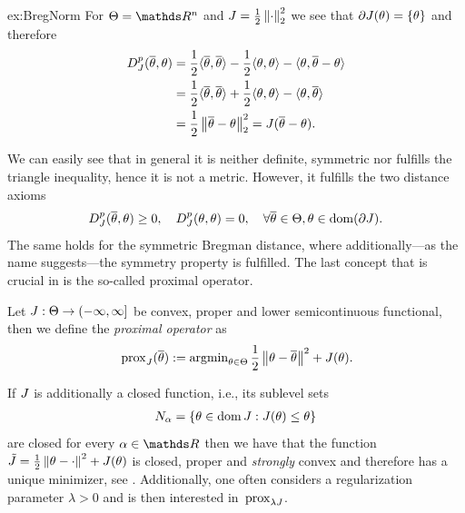 %
\begin{example}{}{ex:BregNorm}
	For $\Param=\R^n$ and $J=\frac{1}{2}\left\|\cdot\right\|_2^2$ we see that $\partial J(\theta) = \{\theta\}$ and therefore
	\begin{align*}
		D_J^p(\overline{\theta}, \theta) &= 
		\frac{1}{2}\langle \overline{\theta},\overline{\theta}\rangle - 
		\frac{1}{2}\langle \theta,\theta\rangle - \langle \theta, \overline{\theta}-\theta\rangle 
		\\&=
		\frac{1}{2}\langle \overline{\theta},\overline{\theta}\rangle+
		\frac{1}{2}\langle \theta,\theta\rangle -
		\langle \theta,\overline{\theta}\rangle
		\\&=
		\frac{1}{2}\left\|\overline{\theta} - \theta\right\|_2^2 = J(\overline{\theta} - \theta).
	\end{align*}
\end{example}
%
We can easily see that in general it is neither definite, symmetric nor fulfills the triangle inequality, hence it is not a metric. 
However, it fulfills the two distance axioms
\begin{align}
	D^p_J(\overline{\theta},\theta) \geq 0,\quad D^p_J(\theta,\theta)=0,\quad\forall\overline{\theta}\in\Theta,\theta\in\operatorname{dom}(\partial J).
\end{align}
%
The same holds for the symmetric Bregman distance, where additionally---as the name suggests---the symmetry property is fulfilled.
%
%
The last concept that is crucial in \cite{bungert2022bregman} is the so-called proximal operator.
%
\begin{definition}{}{}
	Let $J:\Theta\to(-\infty,\infty]$  be convex, proper and lower semicontinuous functional, then we define the \emph{proximal operator} as
	\begin{align*}
		\,\mathrm{prox}_{J}(\overline{\theta}) := \operatorname{argmin}_{\theta\in\Theta} \frac{1}{2}\left\|\theta-\overline{\theta}\right\|^2 + J(\theta).
	\end{align*}
\end{definition}
%
If $J$ is additionally a closed function, i.e., its sublevel sets
%
\begin{align*}
	N_\alpha = \{\theta\in\operatorname{dom} J: J(\theta)\leq \theta\}
\end{align*} 
%
are closed for every $\alpha\in\R$ then we have that the function $\tilde J = \frac{1}{2}\left\|\theta -\cdot\right\|^2 + J(\theta)$ is closed, proper and \emph{strongly} convex and therefore has a unique minimizer, see \cite[Thm. 27.1]{rockafellar1997convex}. Additionally, one often considers a regularization parameter $\lambda>0$ and is then interested in $\,\mathrm{prox}_{\lambda J}$.

